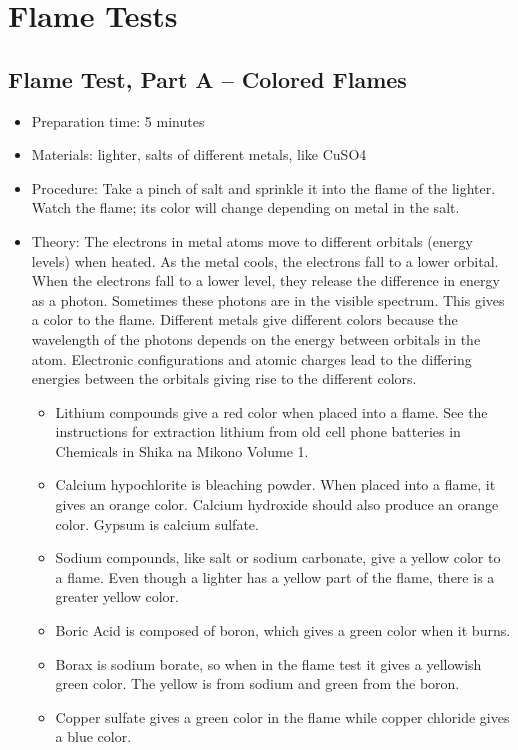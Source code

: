 \section{Flame Tests}

\subsection{Flame Test, Part A – Colored Flames}
\begin{itemize}
\item{Preparation time: 5 minutes}
\item{Materials: lighter, salts of different metals, like CuSO4}
\item{Procedure: Take a pinch of salt and sprinkle it into the flame of the lighter. Watch the flame; its color will change depending on metal in the salt.}
\item{Theory: The electrons in metal atoms move to different orbitals (energy levels) when heated. As the metal cools, the electrons fall to a lower orbital. When the electrons fall to a lower level, they release the difference in energy as a photon. Sometimes these photons are in the visible spectrum. This gives a color to the flame. Different metals give different colors because the wavelength of the photons depends on the energy between orbitals in the atom. Electronic configurations and atomic charges lead to the differing energies between the orbitals giving rise to the different colors.
\begin{itemize}
\item{Lithium compounds give a red color when placed into a flame. See the instructions for extraction lithium from old cell phone batteries in Chemicals in Shika na Mikono Volume 1.}
\item{Calcium hypochlorite is bleaching powder. When placed into a flame, it gives an orange color. Calcium hydroxide should also produce an orange color. Gypsum is calcium sulfate.}
\item{Sodium compounds, like salt or sodium carbonate, give a yellow color to a flame. Even though a lighter has a yellow part of the flame, there is a greater yellow color.}
\item{Boric Acid is composed of boron, which gives a green color when it burns.}
\item{Borax is sodium borate, so when in the flame test it gives a yellowish green color. The yellow is from sodium and green from the boron.}
\item{Copper sulfate gives a green color in the flame while copper chloride gives a blue color.}

\end{itemize}}
\end{itemize}
